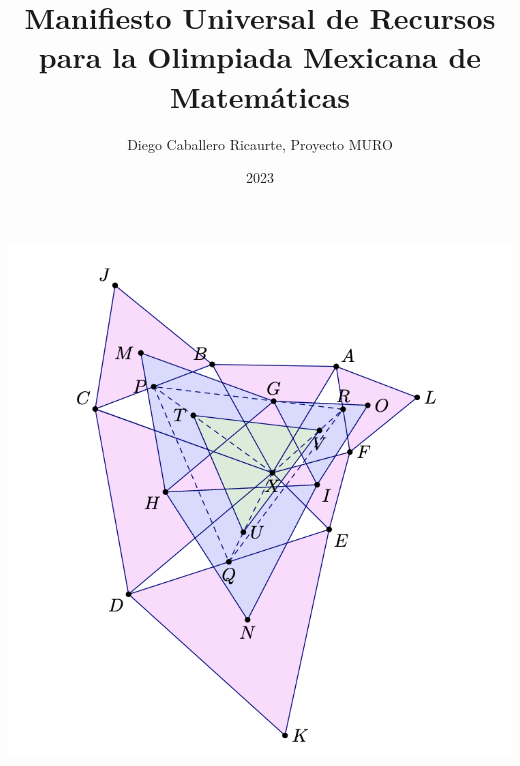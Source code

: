 \documentclass[11pt]{book}
\begin{document}
\title{Manifiesto Universal de Recursos para la Olimpiada Mexicana de Matemáticas}
\author{Diego Caballero Ricaurte, Proyecto MURO}
\date{2023}

\maketitle
\null\vfill
\begin{center}
    \includegraphics{images/muro.png}
\end{center}
\null\vfill

\hypertarget{tabla}{\tableofcontents}


















\end{document}
